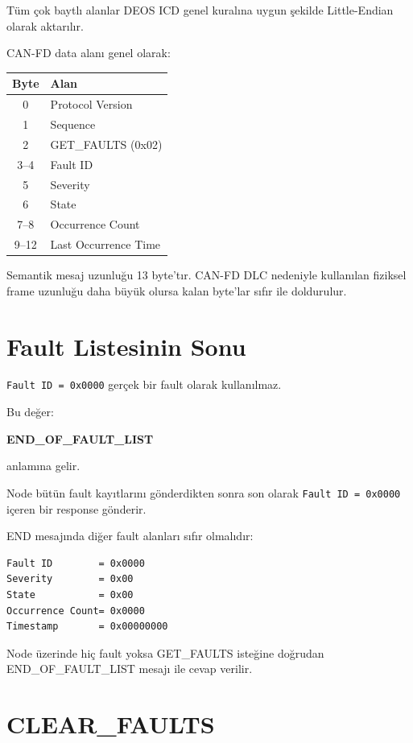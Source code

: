 \documentclass[a4paper,11pt]{article}
\begin{document}
Tüm çok baytlı alanlar DEOS ICD genel kuralına uygun şekilde
Little-Endian olarak aktarılır.

CAN-FD data alanı genel olarak:

\begin{center}
\begin{tabular}{c l}
\toprule
\textbf{Byte} & \textbf{Alan} \\
\midrule
0 & Protocol Version \\
1 & Sequence \\
2 & GET\_FAULTS (0x02) \\
3--4 & Fault ID \\
5 & Severity \\
6 & State \\
7--8 & Occurrence Count \\
9--12 & Last Occurrence Time \\
\bottomrule
\end{tabular}
\end{center}

Semantik mesaj uzunluğu 13 byte'tır.
CAN-FD DLC nedeniyle kullanılan fiziksel frame uzunluğu daha büyük
olursa kalan byte'lar sıfır ile doldurulur.

\section{Fault Listesinin Sonu}

\texttt{Fault ID = 0x0000} gerçek bir fault olarak kullanılmaz.

Bu değer:

\begin{center}
\textbf{END\_OF\_FAULT\_LIST}
\end{center}

anlamına gelir.

Node bütün fault kayıtlarını gönderdikten sonra son olarak
\texttt{Fault ID = 0x0000} içeren bir response gönderir.

END mesajında diğer fault alanları sıfır olmalıdır:

\begin{lstlisting}
Fault ID        = 0x0000
Severity        = 0x00
State           = 0x00
Occurrence Count= 0x0000
Timestamp       = 0x00000000
\end{lstlisting}

Node üzerinde hiç fault yoksa GET\_FAULTS isteğine doğrudan
END\_OF\_FAULT\_LIST mesajı ile cevap verilir.

\section{CLEAR\_FAULTS}
\end{document}
